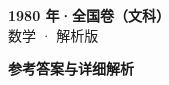 \documentclass[zihao=-4, a4paper]{ctexart}
\begin{document}
\begin{center}
  {\Large\bfseries 1980 年·全国卷（文科）}\\[4pt]
  {\large 数学 · 解析版}
\end{center}
\medskip
{}

\clearpage
{}
\begin{center}{\Large\bfseries 参考答案与详细解析}\end{center}
\medskip

\end{document}
